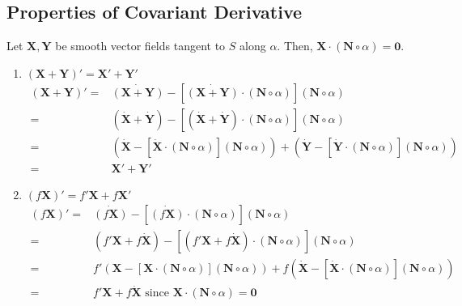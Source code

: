 \subsection{Properties of Covariant Derivative}
Let $\boldsymbol{X},\boldsymbol{Y}$ be smooth vector fields tangent to $S$ along $\alpha$.
Then, $\boldsymbol{X} \cdot (\boldsymbol{N} \circ \alpha) = \boldsymbol{0}$.
\begin{enumerate}
	\item $(\boldsymbol{X}+\boldsymbol{Y})' = \boldsymbol{X}'+\boldsymbol{Y}'$\\
	\begin{align*}
		(\boldsymbol{X} + \boldsymbol{Y})' = & \dot{(\boldsymbol{X}+\boldsymbol{Y})} - [\dot{(\boldsymbol{X}+\boldsymbol{Y})} \cdot (\boldsymbol{N} \circ \alpha)] (\boldsymbol{N} \circ \alpha) \\
		= & (\dot{\boldsymbol{X}} + \dot{\boldsymbol{Y}}) - [(\dot{\boldsymbol{X}} + \dot{\boldsymbol{Y}}) \cdot (\boldsymbol{N} \circ \alpha)] (\boldsymbol{N} \circ \alpha) \\
		= & \left( \dot{\boldsymbol{X}} - \left[ \dot{\boldsymbol{X}} \cdot (\boldsymbol{N} \circ \alpha) \right] (\boldsymbol{N} \circ \alpha) \right) + \left( \dot{\boldsymbol{Y}} - \left[ \dot{\boldsymbol{Y}} \cdot (\boldsymbol{N} \circ \alpha) \right] (\boldsymbol{N} \circ \alpha) \right)\\
		= & \boldsymbol{X}' + \boldsymbol{Y}'
	\end{align*}
	\item $(f\boldsymbol{X})' = f'\boldsymbol{X} + f\boldsymbol{X}'$\\
	\begin{align*}
		(f\boldsymbol{X})' = & \dot{(f\boldsymbol{X})} - \left[ \dot{(f\boldsymbol{X})} \cdot (\boldsymbol{N} \circ \alpha) \right] (\boldsymbol{N} \circ \alpha) \\
		= & \left( f'\boldsymbol{X} + f\dot{\boldsymbol{X}} \right) - \left[ (f'\boldsymbol{X} + f\dot{\boldsymbol{X}}) \cdot (\boldsymbol{N}\circ\alpha) \right] (\boldsymbol{N} \circ \alpha) \\
		= & f'\left( \boldsymbol{X}-\left[ \boldsymbol{X} \cdot (\boldsymbol{N} \circ \alpha) \right] (\boldsymbol{N} \circ \alpha) \right) + f\left( \dot{\boldsymbol{X}} - \left[ \dot{\boldsymbol{X}} \cdot (\boldsymbol{N} \circ \alpha) \right] (\boldsymbol{N} \circ \alpha) \right) \\
		= & f'\boldsymbol{X} + f \dot{\boldsymbol{X}} \text{ since } \boldsymbol{X} \cdot (\boldsymbol{N} \circ \alpha) = \boldsymbol{0}
	\end{align*}

\end{enumerate}

